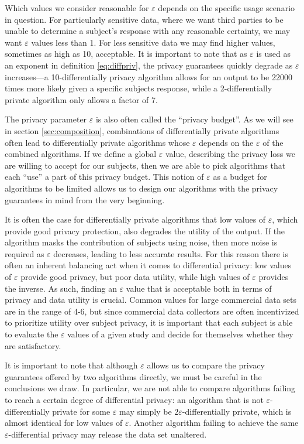 \documentclass[a4paper,12pt]{article}
\renewcommand{\epsilon}{\varepsilon}
\begin{document}
Which values we consider reasonable for $\epsilon$ depends on the specific usage scenario in question. For particularly sensitive data, where we want third parties to be unable to determine a subject's response with any reasonable certainty, we may want $\epsilon$ values less than 1. For less sensitive data we may find higher values, sometimes as high as 10, acceptable. It is important to note that as $\epsilon$ is used as an exponent in definition \ref{eq:diffpriv}, the privacy guarantees quickly degrade as $\epsilon$ increases---a 10-differentially privacy algorithm allows for an output to be 22000 times more likely given a specific subjects response, while a 2-differentially private algorithm only allows a factor of 7.

The privacy parameter $\epsilon$ is also often called the ``privacy budget''. As we will see in section \ref{sec:composition}, combinations of differentially private algorithms often lead to differentially private algorithms whose $\epsilon$ depends on the $\epsilon$ of the combined algorithms. If we define a global $\epsilon$ value, describing the privacy loss we are willing to accept for our subjects, then we are able to pick algorithms that each ``use'' a part of this privacy budget. This notion of $\epsilon$ as a budget for algorithms to be limited allows us to design our algorithms with the privacy guarantees in mind from the very beginning.

It is often the case for differentially private algorithms that low values of $\epsilon$, which provide good privacy protection, also degrades the utility of the output. If the algorithm masks the contribution of subjects using noise, then more noise is required as $\epsilon$ decreases, leading to less accurate results. For this reason there is often an inherent balancing act when it comes to differential privacy: low values of $\epsilon$ provide good privacy, but poor data utility, while high values of $\epsilon$ provides the inverse. As such, finding an $\epsilon$ value that is acceptable both in terms of privacy and data utility is crucial. Common values for large commercial data sets \cite{apple_differential,us_census} are in the range of 4-6, but since commercial data collectors are often incentivized to prioritize utility over subject privacy, it is important that each subject is able to evaluate the $\epsilon$ values of a given study and decide for themselves whether they are satisfactory.

It is important to note that although $\epsilon$ allows us to compare the privacy guarantees offered by two algorithms directly, we must be careful in the conclusions we draw. In particular, we are not able to compare algorithms failing to reach a certain degree of differential privacy: an algorithm that is not $\epsilon$-differentially private for some $\epsilon$ may simply be $2\epsilon$-differentially private, which is almost identical for low values of $\epsilon$. Another algorithm failing to achieve the same $\epsilon$-differential privacy may release the data set unaltered.
\end{document}
